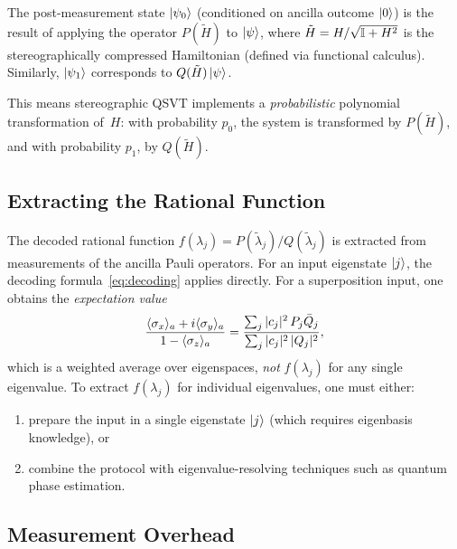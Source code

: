 \begin{proposition}
	\label{prop:post-measurement}
	The post-measurement state $\ket{\psi_0}$ (conditioned on
	ancilla outcome $\ket{0}$) is the result of applying the
	operator $P(\tilde{H})$ to $\ket{\psi}$, where
	$\tilde{H} = H/\sqrt{\mathbb{I} + H^2}$ is the
	stereographically compressed Hamiltonian (defined via
	functional calculus).  Similarly, $\ket{\psi_1}$
	corresponds to $Q(\tilde{H})\ket{\psi}$.
\end{proposition}

This means stereographic QSVT implements a \emph{probabilistic}
polynomial transformation of~$H$: with probability $p_0$, the
system is transformed by $P(\tilde{H})$, and with probability
$p_1$, by $Q(\tilde{H})$.

\subsection{Extracting the Rational Function}
\label{subsec:extracting}

The decoded rational function $f(\lambda_j) =
	P(\tilde{\lambda}_j)/Q(\tilde{\lambda}_j)$ is extracted from
measurements of the ancilla Pauli operators.  For an input
eigenstate $\ket{j}$, the decoding formula~\eqref{eq:decoding}
applies directly.  For a superposition input, one obtains the
\emph{expectation value}
\begin{equation}
	\frac{\langle\sigma_x\rangle_a + i\langle\sigma_y\rangle_a}
	{1 - \langle\sigma_z\rangle_a}
	= \frac{\sum_j |c_j|^2\,P_j\bar{Q}_j}
	{\sum_j |c_j|^2\,|Q_j|^2},
	\label{eq:superposition-decoding}
\end{equation}
which is a weighted average over eigenspaces, \emph{not}
$f(\lambda_j)$ for any single eigenvalue.  To extract
$f(\lambda_j)$ for individual eigenvalues, one must either:
\begin{enumerate}
	\item prepare the input in a single eigenstate $\ket{j}$
	      (which requires eigenbasis knowledge), or
	\item combine the protocol with eigenvalue-resolving
	      techniques such as quantum phase estimation.
\end{enumerate}

\subsection{Measurement Overhead}
\label{subsec:overhead}

